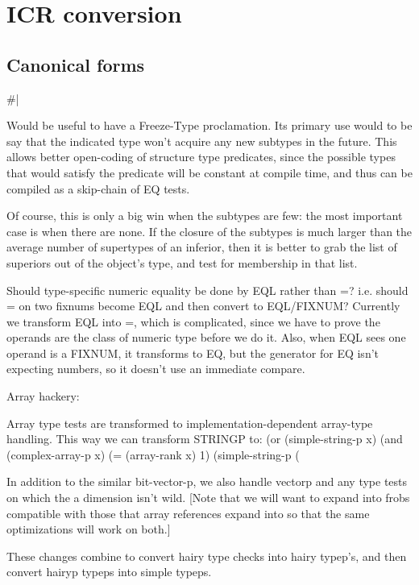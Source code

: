 \chapter{ICR conversion} %



\section{Canonical forms}

\#|

Would be useful to have a Freeze-Type proclamation.  Its primary use would to
be say that the indicated type won't acquire any new subtypes in the future.
This allows better open-coding of structure type predicates, since the possible
types that would satisfy the predicate will be constant at compile time, and
thus can be compiled as a skip-chain of EQ tests.  

Of course, this is only a big win when the subtypes are few: the most important
case is when there are none.  If the closure of the subtypes is much larger
than the average number of supertypes of an inferior, then it is better to grab
the list of superiors out of the object's type, and test for membership in that
list.

Should type-specific numeric equality be done by EQL rather than =?  i.e.
should = on two fixnums become EQL and then convert to EQL/FIXNUM?
Currently we transform EQL into =, which is complicated, since we have to prove
the operands are the class of numeric type before we do it.  Also, when EQL
sees one operand is a FIXNUM, it transforms to EQ, but the generator for EQ
isn't expecting numbers, so it doesn't use an immediate compare.


Array hackery:


Array type tests are transformed to %
implementation-dependent array-type handling.  This way we can transform
STRINGP to:
     (or (simple-string-p x)
	 (and (complex-array-p x)
	      (= (array-rank x) 1)
	      (simple-string-p (%

In addition to the similar bit-vector-p, we also handle vectorp and any type
tests on which the a dimension isn't wild.
[Note that we will want to expand into frobs compatible with those that
array references expand into so that the same optimizations will work on both.]

These changes combine to convert hairy type checks into hairy typep's, and then
convert hairyp typeps into simple typeps.


